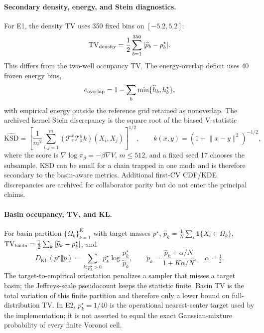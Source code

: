 \documentclass[11pt]{article}
\newcommand{\KL}{D_{\mathrm{KL}}}
\newcommand{\one}{\mathbf{1}}
\newcommand{\piB}{\pi_\beta}
\begin{document}
\paragraph{Secondary density, energy, and Stein diagnostics.}
For E1, the density TV uses 350 fixed bins on $[-5.2,5.2]$:
\begin{equation}
 \mathrm{TV}_{\rm density}
 =\frac12\sum_{b=1}^{350}|\widehat p_b-p_b^\star|.
\end{equation}
This differs from the two-well occupancy TV.  The energy-overlap deficit uses
40 frozen energy bins,
\begin{equation}
 e_{\rm overlap}=1-\sum_b\min\{\widehat h_b,h_b^\star\},
\end{equation}
with empirical energy outside the reference grid retained as nonoverlap.
The archived kernel Stein discrepancy is the square root of the biased
V-statistic
\begin{equation}
 \widehat{\mathrm{KSD}}
 =\left[\frac1{m^2}\sum_{i,j=1}^{m}
 (\mathcal T_\pi^x\mathcal T_\pi^y k)(X_i,X_j)\right]^{1/2},
 \qquad
 k(x,y)=(1+\lVert x-y\rVert^2)^{-1/2},
\end{equation}
where the score is $\nabla\log\piB=-\beta\nabla V$, $m\le512$, and a fixed
seed 17 chooses the subsample.  KSD can be small for a chain trapped in one
mode and is therefore secondary to the basin-aware metrics.  Additional
first-CV CDF/KDE discrepancies are archived for collaborator parity but do
not enter the principal claims.

\paragraph{Basin occupancy, TV, and KL.}  For basin partition
$\{\Omega_k\}_{k=1}^K$ with target masses $p^\star$,
$\widehat p_k=\frac1N\sum_i\one\{X_i\in\Omega_k\}$,
$\mathrm{TV}_{\rm basin}=\frac12\sum_k|\widehat p_k-p^\star_k|$, and
\begin{equation}
 \KL(p^\star\Vert\widetilde p)
 =\sum_{k:p^\star_k>0}p^\star_k\log\frac{p^\star_k}{\widetilde p_k},
 \qquad
 \widetilde p_k=\frac{\widehat p_k+\alpha/N}{1+K\alpha/N},\quad\alpha=\tfrac12 .
\end{equation}
The target-to-empirical orientation penalizes a sampler that misses a target
basin; the Jeffreys-scale pseudocount keeps the statistic finite.  Basin TV is
the total variation of this finite partition and therefore only a lower bound
on full-distribution TV.  In E2, $p_k^\star=1/40$ is the operational
nearest-center target used by the implementation; it is not asserted to equal
the exact Gaussian-mixture probability of every finite Voronoi cell.
\end{document}
